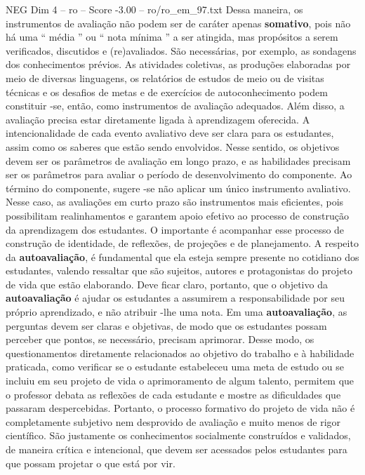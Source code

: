 \begin{textsample}{NEG Dim 4 – ro – Score -3.00 – ro/ro\_em\_97.txt}
Dessa maneira, os instrumentos de avaliação não podem ser de caráter apenas \textbf{somativo}, pois não há uma “ média ” ou “ nota mínima ” a ser atingida, mas propósitos a serem verificados, discutidos e (re)avaliados.
São necessárias, por exemplo, as sondagens dos conhecimentos prévios.
As atividades coletivas, as produções elaboradas por meio de diversas linguagens, os relatórios de estudos de meio ou de visitas técnicas e os desafios de metas e de exercícios de autoconhecimento podem constituir -se, então, como instrumentos de avaliação adequados.
Além disso, a avaliação precisa estar diretamente ligada à aprendizagem oferecida.
A intencionalidade de cada evento avaliativo deve ser clara para os estudantes, assim como os saberes que estão sendo envolvidos.
Nesse sentido, os objetivos devem ser os parâmetros de avaliação em longo prazo, e as habilidades precisam ser os parâmetros para avaliar o período de desenvolvimento do componente.
Ao término do componente, sugere -se não aplicar um único instrumento avaliativo.
Nesse caso, as avaliações em curto prazo são instrumentos mais eficientes, pois possibilitam realinhamentos e garantem apoio efetivo ao processo de construção da aprendizagem dos estudantes.
O importante é acompanhar esse processo de construção de identidade, de reflexões, de projeções e de planejamento.
A respeito da \textbf{autoavaliação}, é fundamental que ela esteja sempre presente no cotidiano dos estudantes, valendo ressaltar que são sujeitos, autores e protagonistas do projeto de vida que estão elaborando.
Deve ficar claro, portanto, que o objetivo da \textbf{autoavaliação} é ajudar os estudantes a assumirem a responsabilidade por seu próprio aprendizado, e não atribuir -lhe uma nota.
Em uma \textbf{autoavaliação}, as perguntas devem ser claras e objetivas, de modo que os estudantes possam perceber que pontos, se necessário, precisam aprimorar.
Desse modo, os questionamentos diretamente relacionados ao objetivo do trabalho e à habilidade praticada, como verificar se o estudante estabeleceu uma meta de estudo ou se incluiu em seu projeto de vida o aprimoramento de algum talento, permitem que o professor debata as reflexões de cada estudante e mostre as dificuldades que passaram despercebidas.
Portanto, o processo formativo do projeto de vida não é completamente subjetivo nem desprovido de avaliação e muito menos de rigor científico.
São justamente os conhecimentos socialmente construídos e validados, de maneira crítica e intencional, que devem ser acessados pelos estudantes para que possam projetar o que está por vir.

\end{textsample}
